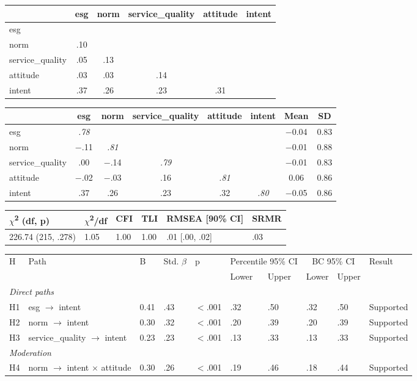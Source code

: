 \documentclass{article}
\begin{document}
\begin{tabular}{lccccc}
\toprule
 & esg & norm & service\_quality & attitude & intent \\
\midrule
esg &  &  &  &  &  \\
norm & .10 &  &  &  &  \\
service\_quality & .05 & .13 &  &  &  \\
attitude & .03 & .03 & .14 &  &  \\
intent & .37 & .26 & .23 & .31 &  \\
\bottomrule
\end{tabular}

\begin{tabular}{lccccccc}
\toprule
 & esg & norm & service\_quality & attitude & intent & Mean & SD \\
\midrule
esg & \textit{.78} &  &  &  &  & $-$0.04 & 0.83 \\
norm & $-$.11 & \textit{.81} &  &  &  & $-$0.01 & 0.88 \\
service\_quality & .00 & $-$.14 & \textit{.79} &  &  & $-$0.01 & 0.83 \\
attitude & $-$.02 & $-$.03 & .16 & \textit{.81} &  & 0.06 & 0.86 \\
intent & .37 & .26 & .23 & .32 & \textit{.80} & $-$0.05 & 0.86 \\
\bottomrule
\end{tabular}

\begin{tabular}{llllll}
\toprule
$\chi$\textsuperscript{2} (df, p) & $\chi$\textsuperscript{2}/df & CFI & TLI & RMSEA [90\% CI] & SRMR \\
\midrule
226.74 (215, .278) & 1.05 & 1.00 & 1.00 & .01 [.00, .02] & .03 \\
\bottomrule
\end{tabular}

\begin{tabular}{llllllllll}
\toprule
H & Path & B & Std. $\beta$ & p & \multicolumn{2}{c}{Percentile 95\% CI} & \multicolumn{2}{c}{BC 95\% CI} & Result \\
\cmidrule(lr){6-7} \cmidrule(lr){8-9}
 &  &  &  &  & Lower & Upper & Lower & Upper &  \\
\midrule
\multicolumn{10}{l}{\textit{Direct paths}} \\
H1 & esg $\rightarrow$ intent & 0.41 & .43 & $<$.001 & .32 & .50 & .32 & .50 & Supported \\
H2 & norm $\rightarrow$ intent & 0.30 & .32 & $<$.001 & .20 & .39 & .20 & .39 & Supported \\
H3 & service\_quality $\rightarrow$ intent & 0.23 & .23 & $<$.001 & .13 & .33 & .13 & .33 & Supported \\
\multicolumn{10}{l}{\textit{Moderation}} \\
H4 & norm $\rightarrow$ intent $\times$ attitude & 0.30 & .26 & $<$.001 & .19 & .46 & .18 & .44 & Supported \\
\bottomrule
\end{tabular}
\end{document}
